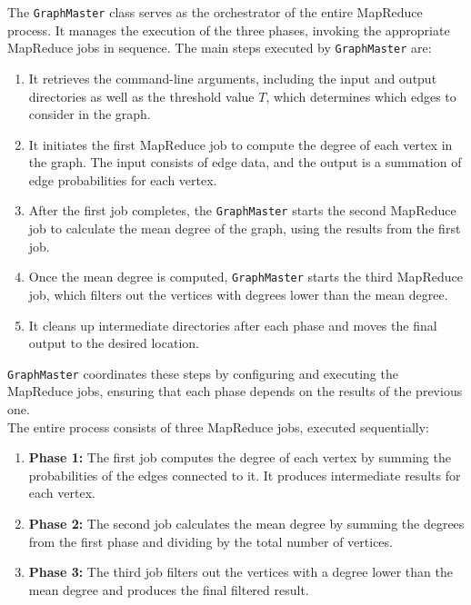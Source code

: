 \documentclass[acmlarge]{acmart}
\begin{document}
  The \texttt{GraphMaster} class serves as the orchestrator of the entire MapReduce process.
  It manages the execution of the three phases, invoking the appropriate MapReduce jobs in sequence.
  The main steps executed by \texttt{GraphMaster} are:

  \begin{enumerate}
    \item It retrieves the command-line arguments, including the input and output directories as well as the threshold
    value \( T \), which determines which edges to consider in the graph.
    \item It initiates the first MapReduce job to compute the degree of each vertex in the graph.
    The input consists of edge data, and the output is a summation of edge probabilities for each vertex.
    \item After the first job completes, the \texttt{GraphMaster} starts the second MapReduce job to calculate the mean
    degree of the graph, using the results from the first job.
    \item Once the mean degree is computed, \texttt{GraphMaster} starts the third MapReduce job, which filters out the
    vertices with degrees lower than the mean degree.
    \item It cleans up intermediate directories after each phase and moves the final output to the desired location.
  \end{enumerate}

  \texttt{GraphMaster} coordinates these steps by configuring and executing the MapReduce jobs, ensuring that each phase
  depends on the results of the previous one. \\

  The entire process consists of three MapReduce jobs, executed sequentially:

  \begin{enumerate}
    \item \textbf{Phase 1:} The first job computes the degree of each vertex by summing the probabilities of the edges
    connected to it.
    It produces intermediate results for each vertex.
    \item \textbf{Phase 2:} The second job calculates the mean degree by summing the degrees from the first phase and
    dividing by the total number of vertices.
    \item \textbf{Phase 3:} The third job filters out the vertices with a degree lower than the mean degree and produces
    the final filtered result.
  \end{enumerate}
\end{document}
